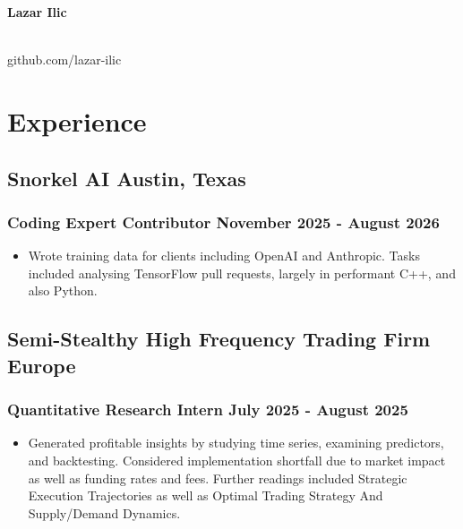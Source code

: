 \documentclass[11pt]{article}
\begin{document}
\begin{center}
	\begin{minipage}{0.6\textwidth}
		{\Huge\bfseries
			Lazar Ilic
		}
	\end{minipage} \hfill
	\begin{minipage}{0.35\textwidth}
		\raggedleft
		\texttt{}\\
		github.com/lazar-ilic
	\end{minipage}
\end{center}

\vspace{-1.5ex}

\section{Experience}
\subsection{Snorkel AI \hfill \normalfont Austin, Texas}
\subsubsection{Coding Expert Contributor \hfill \normalfont November 2025 - August 2026}
\begin{itemize}
	\item Wrote training data for clients including OpenAI and Anthropic. Tasks included analysing TensorFlow pull requests, largely in performant C++, and also Python.
\end{itemize}

\vspace{1ex}

\subsection{Semi-Stealthy High Frequency Trading Firm \hfill \normalfont Europe}
\subsubsection{Quantitative Research Intern \hfill \normalfont July 2025 - August 2025}
\begin{itemize}
	\item Generated profitable insights by studying time series, examining predictors, and backtesting. Considered implementation shortfall due to market impact as well as funding rates and fees. Further readings included Strategic Execution Trajectories as well as Optimal Trading Strategy And Supply/Demand Dynamics.
\end{itemize}
\end{document}
